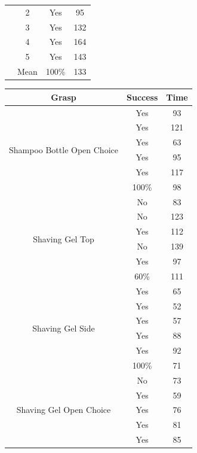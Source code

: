 \begin{table}[t]
\begin{minipage}[t]{0.5\textwidth}
\begin{tabular}[t!]{ | c c c c | }
&2 & Yes & 95 \\
&3 & Yes & 132 \\
&4 & Yes & 164 \\
&5 & Yes & 143 \\ 
& Mean & 100\% & 133\\\hline
\end{tabular}
\end{minipage}
\raggedleft
\begin{minipage}[!t]{.4\textwidth}
\begin{tabular}[t!]{ | c c c | }
\hline
Grasp & Success & Time \\ \hline \hline
\multirow{6}{*}{\begin{minipage}[t]{0.2\columnwidth}Shampoo Bottle Open Choice\end{minipage}}& Yes & 93 \\
& Yes & 121 \\
& Yes & 63 \\
& Yes & 95 \\
& Yes & 117 \\ 
& 100\% & 98\\\hline 
\multirow{6}{*}{\begin{minipage}[t]{0.2\columnwidth}Shaving Gel Top\end{minipage}} & No & 83 \\ 
& No & 123 \\ 
& Yes & 112\\
& No & 139 \\
& Yes & 97 \\ 
&  60\% & 111\\\hline 
\multirow{6}{*}{\begin{minipage}[t]{0.2\columnwidth}Shaving Gel Side\end{minipage}} & Yes & 65 \\
& Yes & 52 \\
& Yes & 57 \\
& Yes & 88 \\
& Yes & 92 \\ 
& 100\% & 71\\\hline 
\multirow{6}{*}{\begin{minipage}[t]{0.2\columnwidth}Shaving Gel Open Choice\end{minipage}} & No & 73 \\
& Yes & 59 \\
& Yes & 76 \\
& Yes & 81 \\
& Yes & 85 \\ 

\end{tabular}
\end{minipage}
\end{table}
